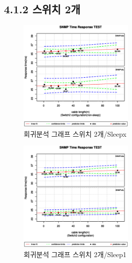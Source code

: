 \documentclass[11pt
  , a4paper
  , article
  , oneside
]{memoir}
\begin{document}
\subsection{4.1.2 스위치 2개}
 \begin{figure}[!htb]
  \centering
  \includegraphics[width=0.5\textwidth]{./images/s2sx.eps}
  \caption{회귀분석 그래프 스위치 2개/Sleepx}
\end{figure}
 \begin{figure}[!htb]
  \centering
  \includegraphics[width=0.5\textwidth]{./images/s2s1.eps}
  \caption{회귀분석 그래프 스위치 2개/Sleep1}
\end{figure}


\clearpage
\end{document}
